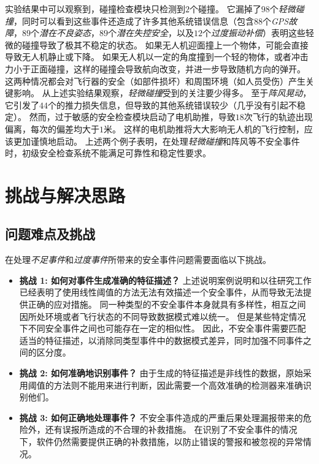 

实验结果中可以观察到，碰撞检查模块只检测到$2$个碰撞。
它漏掉了$98$个\emph{轻微碰撞}，同时可以看到这些事件还造成了许多其他系统错误信息（包含$88$个\emph{GPS故障}，$89$个\emph{潜在不良姿态}，$89$个\emph{潜在失控安全}，以及$12$个\emph{过度振动补偿}）表明这些轻微的碰撞导致了极其不稳定的状态。
如果无人机迎面撞上一个物体，可能会直接导致无人机静止或下降。
如果无人机以一定的角度撞到一个轻的物体，或者冲击力小于正面碰撞，这样的碰撞会导致航向改变，并进一步导致随机方向的弹开。
这两种情况都会对飞行器的安全（如部件损坏）和周围环境（如人员受伤）产生关键影响。
从上述实验结果观察，\emph{轻微碰撞}受到的关注要少得多。
至于\emph{阵风晃动}，它引发了$44$个的推力损失信息，但导致的其他系统错误较少（几乎没有引起不稳定）。
然而，过于敏感的安全检查模块启动了电机助推，导致$18$次飞行的轨迹出现偏离，每次的偏差均大于$1$米。
这样的电机助推将大大影响无人机的飞行控制，应该更加谨慎地启动。
上述两个例子表明，在处理\emph{轻微碰撞}和阵风等不安全事件时，初级安全检查系统不能满足可靠性和稳定性要求。

\section{挑战与解决思路}

\subsection{问题难点及挑战}
在处理\emph{不足事件}和\emph{过度事件}所带来的安全事件问题需要面临以下挑战。

\begin{itemize}
    \item \textbf{挑战 1: 如何对事件生成准确的特征描述？} 
    上述说明案例说明和以往研究工作已经表明了使用线性阈值的方法无法有效描述一个安全事件，从而导致无法提供正确的应对措施。
    同一种类型的不安全事件本身就具有多样性，相互之间因所处环境或者飞行状态的不同导致数据模式难以统一。
    但是某些特定情况下不同安全事件之间也可能存在一定的相似性。
    因此，不安全事件需要匹配适当的特征描述，以消除同类型事件中的数据模式差异，同时加强不同事件之间的区分度。
    
    \item \textbf{挑战 2: 如何准确地识别事件？}
    由于生成的特征描述是非线性的数据，原始采用阈值的方法则不能用来进行判断，因此需要一个高效准确的检测器来准确识别他们。

    \item \textbf{挑战 3: 如何正确地处理事件？}
    不安全事件造成的严重后果处理漏报带来的危险外，还有误报所造成的不合理的补救措施。
    在识别了不安全事件的情况下，软件仍然需要提供正确的补救措施，以防止错误的警报和被忽视的异常情况。
    
\end{itemize}


